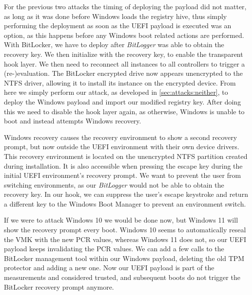 \vspace{1em}



For the previous two attacks the timing of deploying the payload did not matter, as long as it was done before Windows loads the  registry hive, thus simply performing the deployment as soon as the \ac{UEFI} payload is executed was an option, as this happens before any Windows boot related actions are performed.
With BitLocker, we have to deploy after \emph{BitLogger} was able to obtain the recovery key.
We then initialize  with the recovery key, to enable the transparent  hook layer.
We then need to reconnect all  instances to all controllers to trigger a (re-)evaluation.
The BitLocker encrypted drive now appears unencrypted to the \ac{NTFS} driver, allowing it to install its  instance on the encrypted device.
From here we simply perform our attack, as developed in \autoref{sec:attacks:neither}, to deploy the Windows payload and import our modified registry key.
After doing this we need to disable the  hook layer again, as otherwise, Windows is unable to boot and instead attempts Windows recovery.

Windows recovery causes the recovery environment to show a second recovery prompt, but now outside the \ac{UEFI} environment with their own device drivers.
This recovery environment is located on the unencrypted \ac{NTFS} partition created during installation.
It is also accessible when pressing the escape key during the initial \ac{UEFI} environment's recovery prompt.
We want to prevent the user from switching environments, as our \emph{BitLogger} would not be able to obtain the recovery key.
In our  hook, we can suppress the user's escape keystroke and return a different key to the Windows Boot Manager to prevent an environment switch.

If we were to attack Windows 10 we would be done now, but Windows 11 will show the recovery prompt every boot.
Windows 10 seems to automatically reseal the \ac{VMK} with the new \ac{PCR} values, whereas Windows 11 does not, so our \ac{UEFI} payload keeps invalidating the \ac{PCR} values.
We can add a few calls to the BitLocker management tool  \cite{microsoft-bitlocker-manage-bde} within our Windows payload, deleting the old \ac{TPM} protector and adding a new one.
Now our \ac{UEFI} payload is part of the measurements and considered trusted, and subsequent boots do not trigger the BitLocker recovery prompt anymore.

